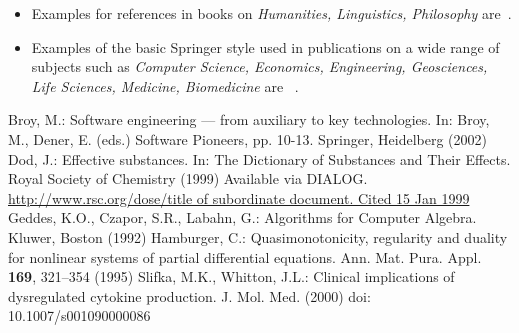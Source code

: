 \documentclass[graybox,envcountchap,sectrefs]{svmono}
\begin{document}
{\begin{itemize}
		\item Examples for references in books on \textit{Humanities, Linguistics, Philosophy} are~\cite{humlinphil-journal, humlinphil-contrib, humlinphil-mono, humlinphil-online, humlinphil-DOI}.
		\item Examples of the basic Springer style used in publications on a wide range of subjects such as \textit{Computer Science, Economics, Engineering, Geosciences, Life Sciences, Medicine, Biomedicine} are ~\cite{basic-contrib, basic-online, basic-journal, basic-DOI, basic-mono}. 
	\end{itemize}
}

\begin{thebibliography}{99.}%
	 Broy, M.: Software engineering --- from auxiliary to key technologies. In: Broy, M., Dener, E. (eds.) Software Pioneers, pp. 10-13. Springer, Heidelberg (2002)
	 Dod, J.: Effective substances. In: The Dictionary of Substances and Their Effects. Royal Society of Chemistry (1999) Available via DIALOG. \\
	\url{http://www.rsc.org/dose/title of subordinate document. Cited 15 Jan 1999}
	 Geddes, K.O., Czapor, S.R., Labahn, G.: Algorithms for Computer Algebra. Kluwer, Boston (1992) 
	 Hamburger, C.: Quasimonotonicity, regularity and duality for nonlinear systems of partial differential equations. Ann. Mat. Pura. Appl. \textbf{169}, 321--354 (1995)
	 Slifka, M.K., Whitton, J.L.: Clinical implications of dysregulated cytokine production. J. Mol. Med. (2000) doi: 10.1007/s001090000086 
	\bigskip
	

\end{thebibliography}
\end{document}
